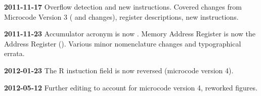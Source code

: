   {\bfseries 2011-11-17} Overflow detection and new instructions. Covered
  changes from Microcode Version 3 ( and  changes),
  register descriptions, new instructions.

  {\bfseries 2011-11-23} Accumulator acronym is now \A. Memory Address
  Register is now the Address Register (\AR). Various minor
  nomenclature changes and typographical errata.

  {\bfseries 2012-01-23} The {\sffamily R} instuction field is now reversed
  (microcode version 4).

  {\bfseries 2012-05-12} Further editing to account for microcode version 4,
  reworked figures.










